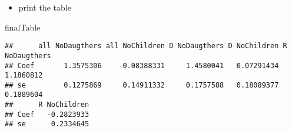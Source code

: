 \documentclass[
]{article}
\newenvironment{Shaded}{\begin{snugshade}}{\end{snugshade}}
\newcommand{\NormalTok}[1]{#1}
\providecommand{\tightlist}{%
  \setlength{\itemsep}{0pt}\setlength{\parskip}{0pt}}
\begin{document}
\begin{itemize}
\tightlist
\item
  print the table
\end{itemize}

\begin{Shaded}
\begin{Highlighting}[]
\NormalTok{finalTable}
\end{Highlighting}
\end{Shaded}

\begin{verbatim}
##      all NoDaugthers all NoChildren D NoDaugthers D NoChildren R NoDaugthers
## Coef       1.3575306    -0.08388331     1.4580041   0.07291434     1.1860812
## se         0.1275869     0.14911332     0.1757588   0.18089377     0.1889604
##      R NoChildren
## Coef   -0.2823933
## se      0.2334645
\end{verbatim}
\end{document}
